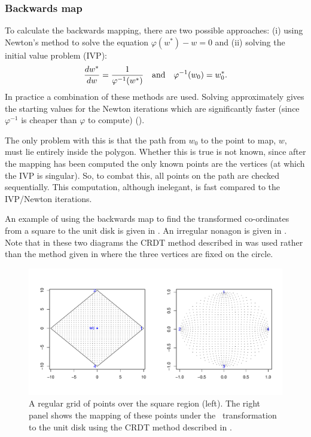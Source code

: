 \subsubsection{Backwards map}

To calculate the backwards mapping, there are two possible approaches: (i) using Newton's method to solve the equation $\varphi(w^*)-w=0$ and (ii) solving the initial value problem (IVP):
\begin{equation}
\label{scivp}
\frac{dw^*}{dw}=\frac{1}{\varphi^{-1}(w^*)} \quad \text{and} \quad \varphi^{-1}(w_0)=w^*_0.
\end{equation}
In practice a combination of these methods are used. Solving  approximately gives the starting values for the Newton iterations which are significantly faster (since $\varphi^{-1}$ is cheaper than $\varphi$ to compute) (\cite[p. 29]{driscoll}).

The only problem with this is that the path from $w_0$ to the point to map, $w$, must lie entirely inside the polygon. Whether this is true is not known, since after the mapping has been computed the only known points are the vertices (at which the IVP is singular). So, to combat this, all points on the path are checked sequentially. This computation, although inelegant, is fast compared to the IVP/Newton iterations.

An example of using the backwards map to find the transformed co-ordinates from a square to the unit disk is given in . An irregular nonagon is given in . Note that in these two diagrams the CRDT method described in  was used rather than the method given in  where the three vertices are fixed on the circle.


\begin{figure}[t]
\centering
\includegraphics[scale=0.5]{sc/figs/squaredomain.pdf}
\caption{A regular grid of points over the square region (left). The right panel shows the mapping of these points under the \sch\ transformation to the unit disk using the CRDT method described in .}
\label{squaredomain}
\end{figure}


